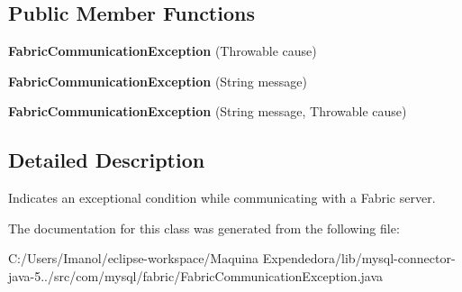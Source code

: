 \subsection*{Public Member Functions}
\begin{DoxyCompactItemize}
\item 
\mbox{\label{classcom_1_1mysql_1_1fabric_1_1_fabric_communication_exception_a94b77edd9d9ecaa7edb5391ad14d5e7d}} 
{\bfseries Fabric\+Communication\+Exception} (Throwable cause)
\item 
\mbox{\label{classcom_1_1mysql_1_1fabric_1_1_fabric_communication_exception_ac8c13ee17098a8ceb07d87a61da065ac}} 
{\bfseries Fabric\+Communication\+Exception} (String message)
\item 
\mbox{\label{classcom_1_1mysql_1_1fabric_1_1_fabric_communication_exception_a9daaa81888588163a38e541495facd6c}} 
{\bfseries Fabric\+Communication\+Exception} (String message, Throwable cause)
\end{DoxyCompactItemize}


\subsection{Detailed Description}
Indicates an exceptional condition while communicating with a Fabric server. 

The documentation for this class was generated from the following file\+:\begin{DoxyCompactItemize}
\item 
C\+:/\+Users/\+Imanol/eclipse-\/workspace/\+Maquina Expendedora/lib/mysql-\/connector-\/java-\/5../src/com/mysql/fabric/Fabric\+Communication\+Exception.\+java\end{DoxyCompactItemize}
